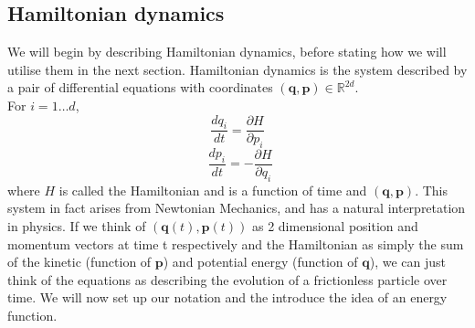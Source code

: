 \documentclass[11pt]{article}
\begin{document}
\subsection{Hamiltonian dynamics}
We will begin by describing Hamiltonian dynamics, before stating how we will utilise them in the next section. Hamiltonian dynamics is the system described by a pair of differential equations with coordinates $(\mathbf{q},\mathbf{p}) \in \mathbb{R}^{2d}$.\\ For $i=1 \dots d$,
\begin{equation}
\label{Ham1}
\frac{dq_{i}}{dt} = \frac{\partial H}{\partial p_{i}}
\end{equation}
\begin{equation}
\label{Ham2}
\ \ \frac{dp_{i}}{dt} = -\frac{\partial H}{\partial q_{i}}
\end{equation}
where $H$ is called the Hamiltonian and is a function of time and $(\mathbf{q},\mathbf{p})$. This system in fact arises from Newtonian Mechanics, and has a natural interpretation in physics. If we think of $(\mathbf{q}(t),\mathbf{p}(t))$ as 2 dimensional position and momentum  vectors at time t respectively and the Hamiltonian as simply the sum of the kinetic (function of $\mathbf{p}$) and potential energy (function of $\mathbf{q}$), we can just think of the equations as describing the evolution of a frictionless particle over time. We will now set up our notation and the introduce the idea of an energy function.
\end{document}
